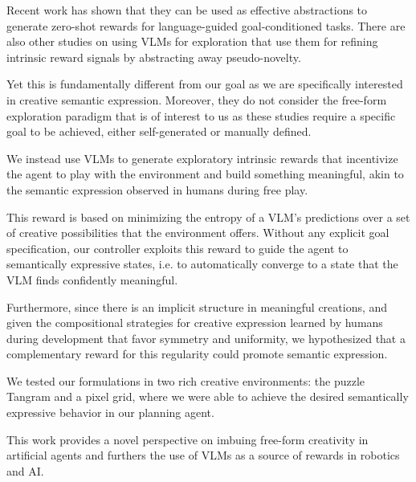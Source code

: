 Recent work \citep{zest,negprompt,vlmrm,lamp} has shown that they can be used as effective abstractions to generate zero-shot rewards for language-guided goal-conditioned tasks.
There are also other studies on using VLMs for exploration \citep{vlmlang,vlmdistill} that use them for refining intrinsic reward signals by abstracting away pseudo-novelty. 

Yet this is fundamentally different from our goal as we are specifically interested in creative semantic expression.
Moreover, they do not consider the free-form exploration paradigm that is of interest to us as these studies require a specific goal to be achieved, either self-generated or manually defined.

We instead use VLMs to generate exploratory intrinsic rewards that incentivize the agent to play with the environment and build something meaningful, akin to the semantic expression observed in humans during free play.

This reward is based on minimizing the entropy of a VLM's predictions over a set of creative possibilities that the environment offers.
Without any explicit goal specification, our controller exploits this reward to guide the agent to semantically expressive states, i.e. to automatically converge to a state that the VLM finds confidently meaningful.


Furthermore, since there is an implicit structure in meaningful creations, and given the compositional strategies for creative expression learned by humans during development \citep{symmetry,compositional} that favor symmetry and uniformity, we hypothesized that a complementary reward for this regularity \citep{rair} could promote semantic expression.

We tested our formulations in two rich creative environments: the puzzle Tangram and a pixel grid, where we were able to achieve the desired semantically expressive behavior in our planning agent.

This work provides a novel perspective on imbuing free-form creativity in artificial agents and furthers the use of VLMs as a source of rewards in robotics and AI.
